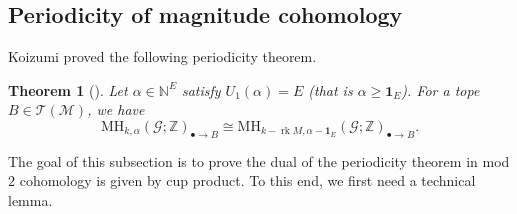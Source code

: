 \documentclass[10pt]{amsart}
\theoremstyle{plain}
\newtheorem{theorem}{Theorem}[section]
\theoremstyle{definition}
\newcommand{\one}{\mathbf{1}}
\newcommand{\NN}{\mathbb{N}}
\newcommand{\ZZ}{\mathbb{Z}}
\newcommand{\T}{\mathcal{T}}
\newcommand{\G}{\mathcal{G}}
\newcommand{\MH}{\mathrm{MH}}
\newcommand{\M}{\mathcal{M}}
\newcommand{\rk}{\operatorname{rk}}
\begin{document}
\subsection{Periodicity of magnitude cohomology}

Koizumi proved the following periodicity theorem.

\begin{theorem}[{\cite[Theorem 3.2]{Koizumi2026a}}]
Let $\alpha\in\NN^E$ satisfy $U_1(\alpha)=E$ (that is $\alpha\geq \one_E$). For a tope $B\in\T(\M)$, we have
\[
\MH_{k,\alpha}(\G;\ZZ)_{\bullet\to B}\cong \MH_{k-\rk M,\alpha-\one_E}(\G;\ZZ)_{\bullet\to B}.    
\]
\end{theorem}

The goal of this subsection is to prove the dual of the periodicity theorem in mod $2$ cohomology is given by cup product. To this end, we first need a technical lemma.
\end{document}
